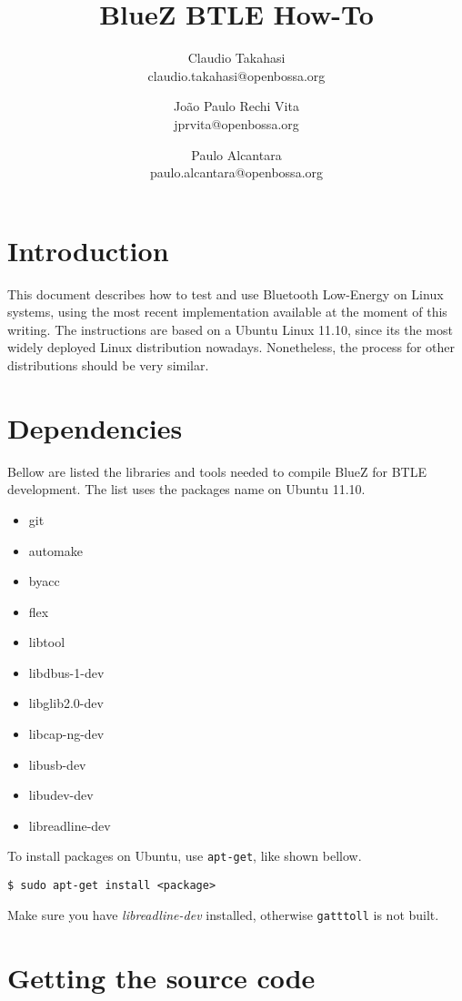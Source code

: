 \documentclass[11pt]{article}
\title{BlueZ BTLE How-To}
\author{Claudio Takahasi \\ claudio.takahasi@openbossa.org \and
        João Paulo Rechi Vita \\ jprvita@openbossa.org \and
        Paulo Alcantara \\ paulo.alcantara@openbossa.org}
\begin{document}
\maketitle
\newpage

\tableofcontents
\newpage

\section{Introduction}

This document describes how to test and use Bluetooth Low-Energy on Linux
systems, using the most recent implementation available at the moment of this
writing. The instructions are based on a Ubuntu Linux 11.10, since its the most
widely deployed Linux distribution nowadays. Nonetheless, the process for other
distributions should be very similar.

\section{Dependencies}

Bellow are listed the libraries and tools needed to compile BlueZ for BTLE
development. The list uses the packages name on Ubuntu 11.10.

\begin{itemize}
 \item git
 \item automake
 \item byacc
 \item flex
 \item libtool
 \item libdbus-1-dev
 \item libglib2.0-dev
 \item libcap-ng-dev
 \item libusb-dev
 \item libudev-dev
 \item libreadline-dev
\end{itemize}

To install packages on Ubuntu, use \verb|apt-get|, like shown bellow.

\begin{verbatim}
$ sudo apt-get install <package>
\end{verbatim}

Make sure you have {\em libreadline-dev} installed, otherwise \verb|gatttoll| is not
built.

\section{Getting the source code}
\end{document}
